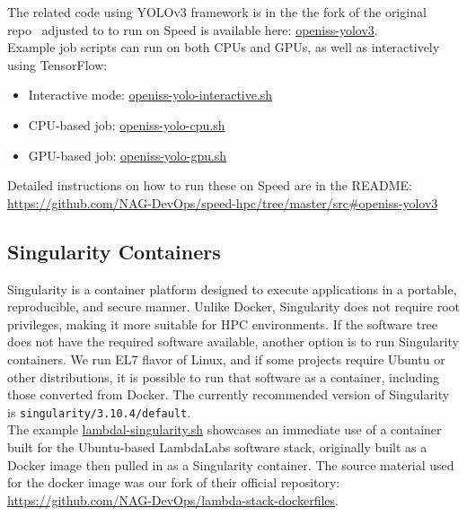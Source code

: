 The related code using YOLOv3 framework is in the
the fork of the original repo~\cite{openiss-yolov3} adjusted
to to run on Speed is available here: \href{https://github.com/NAG-DevOps/openiss-yolov3}{openiss-yolov3}.\\

\noindent Example job scripts can run on both CPUs and GPUs, as well as interactively using TensorFlow:

\begin{itemize}
	\item Interactive mode:
  \href{https://github.com/NAG-DevOps/speed-hpc/blob/master/src/openiss-yolo-interactive.sh}
  {openiss-yolo-interactive.sh}
	\item CPU-based job:
  \href{https://github.com/NAG-DevOps/speed-hpc/blob/master/src/openiss-yolo-cpu.sh}
  {openiss-yolo-cpu.sh}
	\item GPU-based job:
  \href{https://github.com/NAG-DevOps/speed-hpc/blob/master/src/openiss-yolo-gpu.sh}
  {openiss-yolo-gpu.sh}
\end{itemize}

\noindent Detailed instructions on how to run these on Speed are in the README: 
\url{https://github.com/NAG-DevOps/speed-hpc/tree/master/src#openiss-yolov3}

\subsection{Singularity Containers}
\label{sect:singularity-containers}

Singularity is a container platform designed to execute applications in a portable, 
reproducible, and secure manner. Unlike Docker, Singularity does not require root privileges, 
making it more suitable for HPC environments. If the  software tree does not have 
the required software available, another option is to run Singularity containers. 
We run EL7 flavor of Linux, and if some projects require Ubuntu or 
other distributions, it is possible to run that software as a container, 
including those converted from Docker. The currently recommended version of Singularity 
is \texttt{singularity/3.10.4/default}.\\

The example
\href{https://github.com/NAG-DevOps/speed-hpc/blob/master/src/lambdal-singularity.sh}{lambdal-singularity.sh}
showcases an immediate use of a container built for the Ubuntu-based LambdaLabs software stack, 
originally built as a Docker image then pulled in as a Singularity container. The source material
used for the docker image was our fork of their official repository: 
\url{https://github.com/NAG-DevOps/lambda-stack-dockerfiles}.\\

